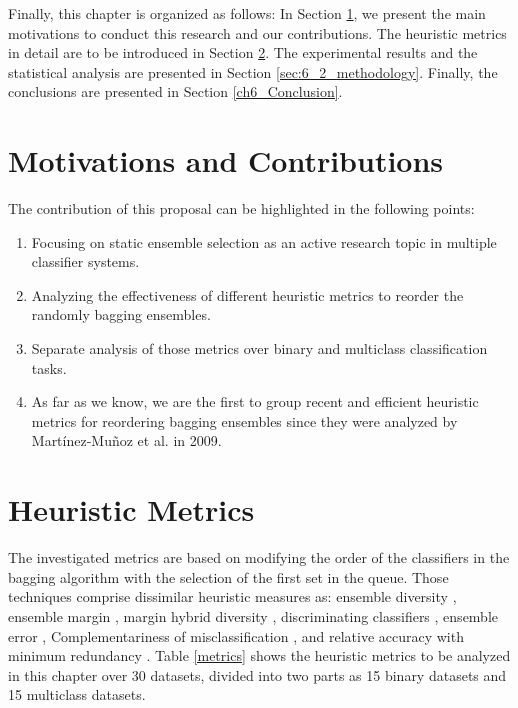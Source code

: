 Finally, this chapter is organized as follows: In Section \ref{ch6_motivations}, we present the main motivations to conduct this research and our contributions. The heuristic metrics in detail are to be introduced in Section \ref{ch6_heuristic-met}. The experimental results and the statistical analysis are presented in Section \ref{sec:6_2_methodology}.  Finally, the conclusions are presented in Section \ref{ch6_Conclusion}.


  


\section{Motivations and Contributions} \label{ch6_motivations}

The contribution of this proposal can be highlighted in the following points:
\begin{enumerate}[nosep]
    \item Focusing on static ensemble selection as an active research topic in multiple classifier systems.
    \item Analyzing the effectiveness of different heuristic metrics to reorder the randomly bagging ensembles.
    \item Separate analysis of those metrics over binary and multiclass classification tasks.
    \item As far as we know, we are the first to group recent and efficient heuristic metrics for reordering bagging ensembles since they were analyzed by Martínez-Muñoz et al. \citep{martinez2009} in 2009.    
    
\end{enumerate}

\section{Heuristic Metrics} \label{ch6_heuristic-met}

The investigated metrics are based on modifying the order of the classifiers in the bagging algorithm with the selection of the first set in the queue. Those techniques comprise dissimilar heuristic measures as: ensemble diversity \cite{lu2010}, ensemble margin \cite{martinez2004,guo2013}, margin hybrid diversity \cite{guo2018}, discriminating classifiers \cite{cao2018}, ensemble error \cite{margineantu1997}, Complementariness of misclassification \cite{martinez2004}, and relative accuracy with minimum redundancy \cite{cao2018}. Table \ref{metrics} shows the heuristic metrics to be analyzed in this chapter over 30 datasets, divided into two parts as 15 binary datasets and 15 multiclass datasets.      
          
